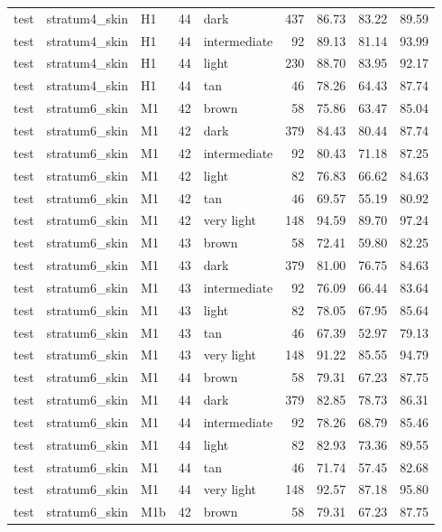 \begin{tabular}{lllrlrrrr}
test & stratum4\_skin & H1 & 44 & dark & 437 & 86.73 & 83.22 & 89.59 \\
test & stratum4\_skin & H1 & 44 & intermediate & 92 & 89.13 & 81.14 & 93.99 \\
test & stratum4\_skin & H1 & 44 & light & 230 & 88.70 & 83.95 & 92.17 \\
test & stratum4\_skin & H1 & 44 & tan & 46 & 78.26 & 64.43 & 87.74 \\
test & stratum6\_skin & M1 & 42 & brown & 58 & 75.86 & 63.47 & 85.04 \\
test & stratum6\_skin & M1 & 42 & dark & 379 & 84.43 & 80.44 & 87.74 \\
test & stratum6\_skin & M1 & 42 & intermediate & 92 & 80.43 & 71.18 & 87.25 \\
test & stratum6\_skin & M1 & 42 & light & 82 & 76.83 & 66.62 & 84.63 \\
test & stratum6\_skin & M1 & 42 & tan & 46 & 69.57 & 55.19 & 80.92 \\
test & stratum6\_skin & M1 & 42 & very light & 148 & 94.59 & 89.70 & 97.24 \\
test & stratum6\_skin & M1 & 43 & brown & 58 & 72.41 & 59.80 & 82.25 \\
test & stratum6\_skin & M1 & 43 & dark & 379 & 81.00 & 76.75 & 84.63 \\
test & stratum6\_skin & M1 & 43 & intermediate & 92 & 76.09 & 66.44 & 83.64 \\
test & stratum6\_skin & M1 & 43 & light & 82 & 78.05 & 67.95 & 85.64 \\
test & stratum6\_skin & M1 & 43 & tan & 46 & 67.39 & 52.97 & 79.13 \\
test & stratum6\_skin & M1 & 43 & very light & 148 & 91.22 & 85.55 & 94.79 \\
test & stratum6\_skin & M1 & 44 & brown & 58 & 79.31 & 67.23 & 87.75 \\
test & stratum6\_skin & M1 & 44 & dark & 379 & 82.85 & 78.73 & 86.31 \\
test & stratum6\_skin & M1 & 44 & intermediate & 92 & 78.26 & 68.79 & 85.46 \\
test & stratum6\_skin & M1 & 44 & light & 82 & 82.93 & 73.36 & 89.55 \\
test & stratum6\_skin & M1 & 44 & tan & 46 & 71.74 & 57.45 & 82.68 \\
test & stratum6\_skin & M1 & 44 & very light & 148 & 92.57 & 87.18 & 95.80 \\
test & stratum6\_skin & M1b & 42 & brown & 58 & 79.31 & 67.23 & 87.75 \\

\end{tabular}

